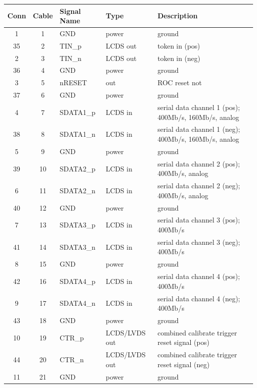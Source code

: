 \begin{table}[p]
    \caption{Connector wiring scheme. Levels: \emph{power} means either ground or regulated power, LCDS/LVDS refers to signal levels as described in the text}
    {\tiny
	\begin{longtable}{cclll}
	    \toprule
	    \multicolumn{1}{l}{Conn} & \multicolumn{1}{l}{Cable} & Signal Name & Type & Description \\ 
	    \midrule
	    1 & 1 & GND & power & ground \\ 
	    35 & 2 & TIN\_p & LCDS out & token in (pos) \\ 
	    2 & 3 & TIN\_n & LCDS out & token in (neg) \\ 
	    36 & 4 & GND & power & ground \\ 
	    3 & 5 & nRESET & out & ROC reset not \\ 
	    37 & 6 & GND & power & ground \\ 
	    4 & 7 & SDATA1\_p & LCDS in & serial data channel 1 (pos); 400Mb/s, 160Mb/s, analog \\ 
	    38 & 8 & SDATA1\_n & LCDS in & serial data channel 1 (neg); 400Mb/s, 160Mb/s, analog \\ 
	    5 & 9 & GND & power & ground \\ 
	    39 & 10 & SDATA2\_p & LCDS in & serial data channel 2 (pos); 400Mb/s, analog \\ 
	    6 & 11 & SDATA2\_n & LCDS in & serial data channel 2 (neg); 400Mb/s, analog \\ 
	    40 & 12 & GND & power & ground \\ 
	    7 & 13 & SDATA3\_p & LCDS in & serial data channel 3 (pos); 400Mb/s \\ 
	    41 & 14 & SDATA3\_n & LCDS in & serial data channel 3 (neg); 400Mb/s \\ 
	    8 & 15 & GND & power & ground \\ 
	    42 & 16 & SDATA4\_p & LCDS in & serial data channel 4 (pos); 400Mb/s \\ 
	    9 & 17 & SDATA4\_n & LCDS in & serial data channel 4 (neg); 400Mb/s \\ 
	    43 & 18 & GND & power & ground \\ 
	    10 & 19 & CTR\_p & LCDS/LVDS out & combined calibrate trigger reset signal (pos) \\ 
	    44 & 20 & CTR\_n & LCDS/LVDS out & combined calibrate trigger reset signal (neg) \\ 
	    11 & 21 & GND & power & ground \\ 

\end{longtable}}
\end{table}
